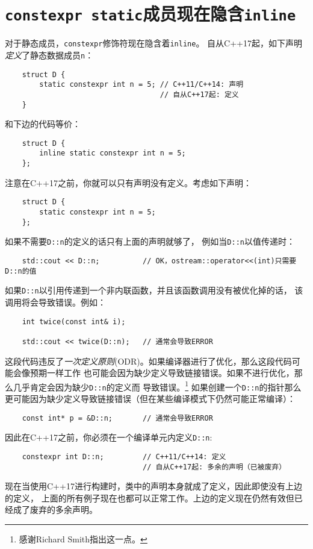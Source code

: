 \section{\texttt{constexpr static}成员现在隐含\texttt{inline}}\label{ch3.3}
对于静态成员，\texttt{constexpr}修饰符现在隐含着\texttt{inline}。
自从C++17起，如下声明\emph{定义}了静态数据成员\texttt{n}：
\begin{lstlisting}
    struct D {
        static constexpr int n = 5; // C++11/C++14: 声明
                                    // 自从C++17起: 定义
    }
\end{lstlisting}
和下边的代码等价：
\begin{lstlisting}
    struct D {
        inline static constexpr int n = 5;
    };
\end{lstlisting}
注意在C++17之前，你就可以只有声明没有定义。考虑如下声明：
\begin{lstlisting}
    struct D {
        static constexpr int n = 5;
    };
\end{lstlisting}
如果不需要\texttt{D::n}的定义的话只有上面的声明就够了，
例如当\texttt{D::n}以值传递时：
\begin{lstlisting}
    std::cout << D::n;          // OK，ostream::operator<<(int)只需要D::n的值
\end{lstlisting}
如果\texttt{D::n}以引用传递到一个非内联函数，并且该函数调用没有被优化掉的话，
该调用将会导致错误。例如：
\begin{lstlisting}
    int twice(const int& i);

    std::cout << twice(D::n);   // 通常会导致ERROR
\end{lstlisting}
这段代码违反了\emph{一次定义原则}(ODR)。如果编译器进行了优化，那么这段代码可能会像预期一样工作
也可能会因为缺少定义导致链接错误。如果不进行优化，那么几乎肯定会因为缺少\texttt{D::n}的定义而
导致错误。\footnote{感谢Richard Smith指出这一点。}
如果创建一个\texttt{D::n}的指针那么更可能因为缺少定义导致链接错误（但在某些编译模式下仍然可能正常编译）：
\begin{lstlisting}
    const int* p = &D::n;       // 通常会导致ERROR
\end{lstlisting}
因此在C++17之前，你必须在一个编译单元内定义\texttt{D::n}:
\begin{lstlisting}
    constexpr int D::n;         // C++11/C++14: 定义
                                // 自从C++17起: 多余的声明（已被废弃）
\end{lstlisting}
现在当使用C++17进行构建时，类中的声明本身就成了定义，因此即使没有上边的定义，
上面的所有例子现在也都可以正常工作。上边的定义现在仍然有效但已经成了废弃的多余声明。

